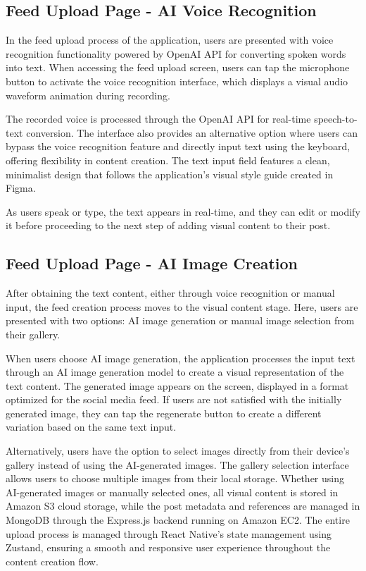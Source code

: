 \documentclass[conference]{IEEEtran}
\begin{document}
    \subsection{Feed Upload Page - AI Voice Recognition}
        In the feed upload process of the application, users are presented with voice recognition functionality powered by OpenAI API for converting spoken words into text. When accessing the feed upload screen, users can tap the microphone button to activate the voice recognition interface, which displays a visual audio waveform animation during recording.

        The recorded voice is processed through the OpenAI API for real-time speech-to-text conversion. The interface also provides an alternative option where users can bypass the voice recognition feature and directly input text using the keyboard, offering flexibility in content creation. The text input field features a clean, minimalist design that follows the application's visual style guide created in Figma.

        As users speak or type, the text appears in real-time, and they can edit or modify it before proceeding to the next step of adding visual content to their post.

    \subsection{Feed Upload Page - AI Image Creation}
        After obtaining the text content, either through voice recognition or manual input, the feed creation process moves to the visual content stage. Here, users are presented with two options: AI image generation or manual image selection from their gallery.

        When users choose AI image generation, the application processes the input text through an AI image generation model to create a visual representation of the text content. The generated image appears on the screen, displayed in a format optimized for the social media feed. If users are not satisfied with the initially generated image, they can tap the regenerate button to create a different variation based on the same text input.

        Alternatively, users have the option to select images directly from their device's gallery instead of using the AI-generated images. The gallery selection interface allows users to choose multiple images from their local storage. Whether using AI-generated images or manually selected ones, all visual content is stored in Amazon S3 cloud storage, while the post metadata and references are managed in MongoDB through the Express.js backend running on Amazon EC2. The entire upload process is managed through React Native's state management using Zustand, ensuring a smooth and responsive user experience throughout the content creation flow.
\end{document}
